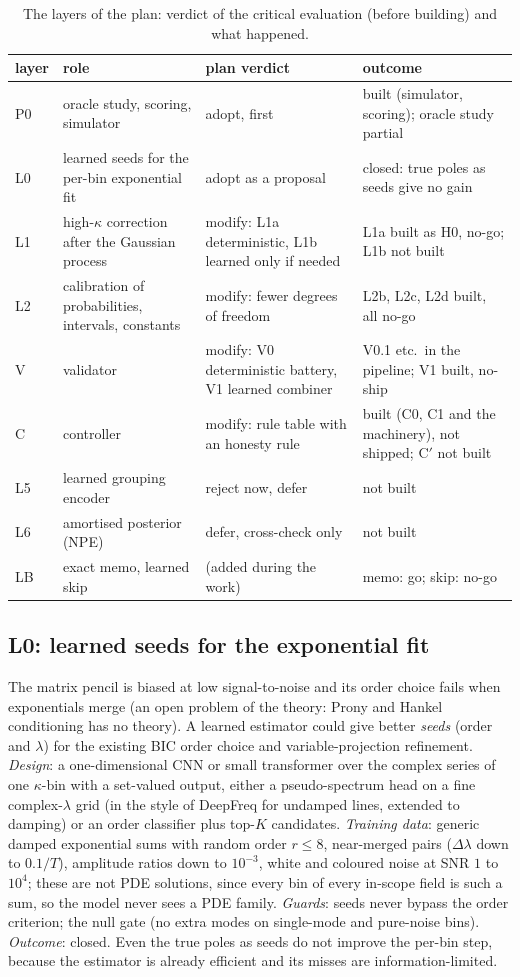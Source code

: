 \begin{table}[tbp]
\centering\small
\caption{The layers of the plan: verdict of the critical evaluation (before building) and what happened.}\label{tab:plan}
\begin{tabular}{@{}p{1.5cm}p{4.2cm}p{3.1cm}p{3.1cm}@{}}
\toprule
layer & role & plan verdict & outcome\\
\midrule
P0 & oracle study, scoring, simulator & adopt, first & built (simulator, scoring); oracle study partial\\
L0 & learned seeds for the per-bin exponential fit & adopt as a proposal & closed: true poles as seeds give no gain\\
L1 & high-$\kappa$ correction after the Gaussian process & modify: L1a deterministic, L1b learned only if needed & L1a built as H0, no-go; L1b not built\\
L2 & calibration of probabilities, intervals, constants & modify: fewer degrees of freedom & L2b, L2c, L2d built, all no-go\\
V & validator & modify: V0 deterministic battery, V1 learned combiner & V0.1 etc.\ in the pipeline; V1 built, no-ship\\
C & controller & modify: rule table with an honesty rule & built (C0, C1 and the machinery), not shipped; C$'$ not built\\
L5 & learned grouping encoder & reject now, defer & not built\\
L6 & amortised posterior (NPE) & defer, cross-check only & not built\\
LB & exact memo, learned skip & (added during the work) & memo: go; skip: no-go\\
\bottomrule
\end{tabular}
\end{table}

\subsection{L0: learned seeds for the exponential fit}
The matrix pencil is biased at low signal-to-noise and its order choice fails when exponentials merge (an open problem of the theory: Prony and Hankel conditioning has no theory). A learned estimator could give better \emph{seeds} (order and $\lambda$) for the existing BIC order choice and variable-projection refinement.
\emph{Design}: a one-dimensional CNN or small transformer over the complex series of one $\kappa$-bin with a set-valued output, either a pseudo-spectrum head on a fine complex-$\lambda$ grid (in the style of DeepFreq for undamped lines, extended to damping) or an order classifier plus top-$K$ candidates.
\emph{Training data}: generic damped exponential sums with random order $r\le8$, near-merged pairs ($\Delta\lambda$ down to $0.1/T$), amplitude ratios down to $10^{-3}$, white and coloured noise at SNR $1$ to $10^4$; these are not PDE solutions, since every bin of every in-scope field is such a sum, so the model never sees a PDE family.
\emph{Guards}: seeds never bypass the order criterion; the null gate (no extra modes on single-mode and pure-noise bins). \emph{Outcome}: closed. Even the true poles as seeds do not improve the per-bin step, because the estimator is already efficient and its misses are information-limited.

